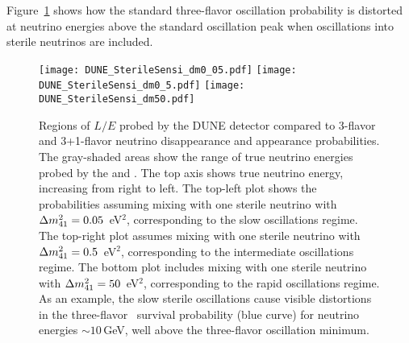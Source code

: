 Figure~\ref{fig:regimes} shows how the standard three-flavor oscillation probability is distorted at neutrino energies above the standard oscillation peak when oscillations into sterile neutrinos are included.
\begin{figure}[!h]
	\vspace{0pt}
	\begin{center}
	  	\texttt{[image: DUNE\_SterileSensi\_dm0\_05.pdf]}
        \texttt{[image: DUNE\_SterileSensi\_dm0\_5.pdf]}
        \texttt{[image: DUNE\_SterileSensi\_dm50.pdf]}
	\end{center}
\vspace{0pt}
\caption[Regions of $L/E$ probed by DUNE compared to 3-flavor and 3+1-flavor $\nu$ (dis)appearance probabilities]{Regions of $L/E$ probed by the DUNE detector compared to 3-flavor and 3+1-flavor neutrino disappearance and appearance probabilities. The gray-shaded areas show the range of true neutrino energies probed by the  and . The top axis shows true neutrino energy, increasing from right to left. The top-left plot shows the probabilities assuming mixing with one sterile neutrino with $\Delta m^2_{\rm{41}}=0.05$~eV$^2$, corresponding to the slow oscillations regime. The top-right plot assumes mixing with one sterile neutrino with $\Delta m^2_{\rm{41}}=0.5$~eV$^2$, corresponding to the intermediate oscillations regime. The bottom plot includes mixing with one sterile neutrino with $\Delta m^2_{\rm{41}}=50$~eV$^2$, corresponding to the rapid oscillations regime. As an example, the slow sterile oscillations cause visible distortions in the three-flavor \numu~survival probability (blue curve) for neutrino energies $\sim10$\,GeV, well above the three-flavor oscillation minimum.}
  \label{fig:regimes}
 \vspace{0pt}
\end{figure}

